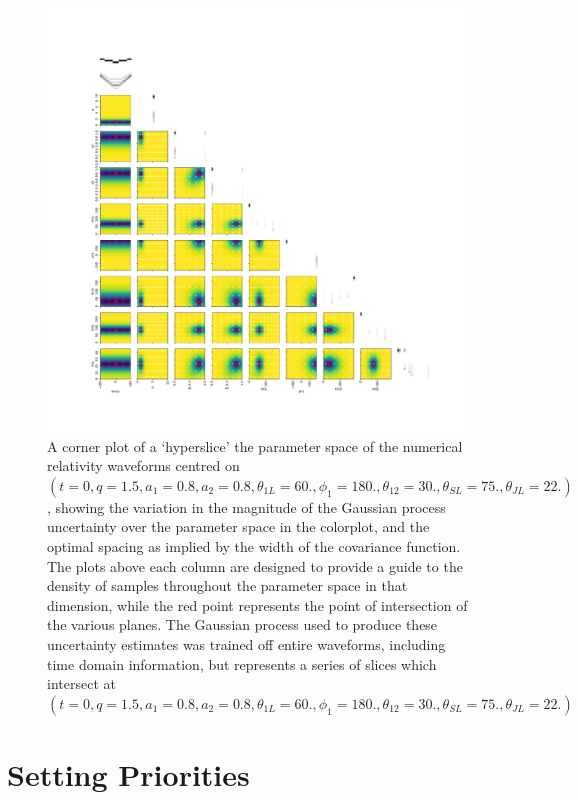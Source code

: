 \documentclass[a4paper]{article}
\begin{document}
\begin{figure}
  \centering
  \includegraphics[width=\textwidth]{spacings.pdf}
  \caption{A corner plot of a `hyperslice' the parameter space of the numerical relativity waveforms centred on $(t=0,  q=1.5,    a_1=0.8,    a_2=0.8,   \theta_{1L}=60. ,  \phi_1 = 180. ,   \theta_{12} = 30. ,   \theta_{SL} = 75. ,   \theta_{JL} = 22. )$, showing the variation in the magnitude of the Gaussian process uncertainty over the parameter space in the colorplot, and the optimal spacing as implied by the width of the covariance function. The plots above each column are designed to provide a guide to the density of samples throughout the parameter space in that dimension, while the red point represents the point of intersection of the various planes. The Gaussian process used to produce these uncertainty estimates was trained off entire waveforms, including time domain information, but represents a series of slices which intersect at $(t=0,  q=1.5,    a_1=0.8,    a_2=0.8,   \theta_{1L}=60. ,  \phi_1 = 180. ,   \theta_{12} = 30. ,   \theta_{SL} = 75. ,   \theta_{JL} = 22. )$}
  \label{fig:spacing}
\end{figure}

\section{Setting Priorities}
\label{sec:priorities}
\end{document}
